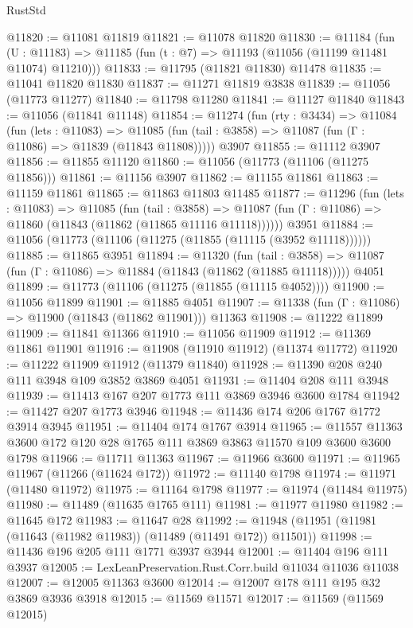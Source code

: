 \begin{lexlean}{RustStd}
\begin{coremodule}
@11820 := @11081 @11819
@11821 := @11078 @11820
@11830 := @11184
    (fun (U : @11183) => @11185 (fun (t : @7) => @11193 (@11056 (@11199 @11481 @11074) @11210)))
@11833 := @11795 (@11821 @11830) @11478
@11835 := @11041 @11820 @11830
@11837 := @11271 @11819 @3838
@11839 := @11056 (@11773 @11277)
@11840 := @11798 @11280
@11841 := @11127 @11840
@11843 := @11056 (@11841 @11148)
@11854 := @11274
    (fun (rty : @3434) =>
    @11084
      (fun (lets : @11083) =>
      @11085 (fun (tail : @3858) => @11087 (fun (Γ : @11086) => @11839 (@11843 @11808)))))
    @3907
@11855 := @11112 @3907
@11856 := @11855 @11120
@11860 := @11056 (@11773 (@11106 (@11275 @11856)))
@11861 := @11156 @3907
@11862 := @11155 @11861
@11863 := @11159 @11861
@11865 := @11863 @11803 @11485
@11877 := @11296
    (fun (lets : @11083) =>
    @11085
      (fun (tail : @3858) =>
      @11087 (fun (Γ : @11086) => @11860 (@11843 (@11862 (@11865 @11116 @11118))))))
    @3951
@11884 := @11056 (@11773 (@11106 (@11275 (@11855 (@11115 (@3952 @11118))))))
@11885 := @11865 @3951
@11894 := @11320
    (fun (tail : @3858) => @11087 (fun (Γ : @11086) => @11884 (@11843 (@11862 (@11885 @11118)))))
    @4051
@11899 := @11773 (@11106 (@11275 (@11855 (@11115 @4052))))
@11900 := @11056 @11899
@11901 := @11885 @4051
@11907 := @11338 (fun (Γ : @11086) => @11900 (@11843 (@11862 @11901))) @11363
@11908 := @11222 @11899
@11909 := @11841 @11366
@11910 := @11056 @11909
@11912 := @11369 @11861 @11901
@11916 := @11908 (@11910 @11912) (@11374 @11772)
@11920 := @11222 @11909 @11912 (@11379 @11840)
@11928 := @11390 @208 @240 @111 @3948 @109 @3852 @3869 @4051
@11931 := @11404 @208 @111 @3948
@11939 := @11413 @167 @207 @1773 @111 @3869 @3946 @3600 @1784
@11942 := @11427 @207 @1773 @3946
@11948 := @11436 @174 @206 @1767 @1772 @3914 @3945
@11951 := @11404 @174 @1767 @3914
@11965 := @11557 @11363 @3600 @172 @120 @28 @1765 @111 @3869 @3863 @11570 @109 @3600 @3600 @1798
@11966 := @11711 @11363
@11967 := @11966 @3600
@11971 := @11965 @11967 (@11266 (@11624 @172))
@11972 := @11140 @1798
@11974 := @11971 (@11480 @11972)
@11975 := @11164 @1798
@11977 := @11974 (@11484 @11975)
@11980 := @11489 (@11635 @1765 @111)
@11981 := @11977 @11980
@11982 := @11645 @172
@11983 := @11647 @28
@11992 := @11948 (@11951 (@11981 (@11643 (@11982 @11983)) (@11489 (@11491 @172)) @11501))
@11998 := @11436 @196 @205 @111 @1771 @3937 @3944
@12001 := @11404 @196 @111 @3937
@12005 := LexLeanPreservation.Rust.Corr.build @11034 @11036 @11038
@12007 := @12005 @11363 @3600
@12014 := @12007 @178 @111 @195 @32 @3869 @3936 @3918
@12015 := @11569 @11571
@12017 := @11569 (@11569 @12015)

\end{coremodule}
\end{lexlean}
